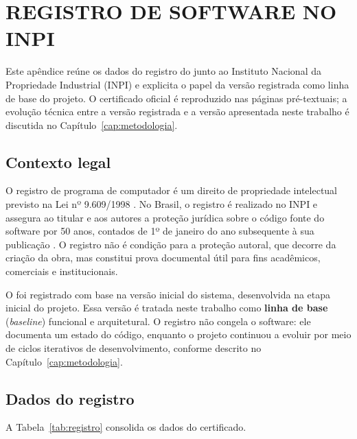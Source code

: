 
\chapter{REGISTRO DE SOFTWARE NO INPI}
\label{ap:registro-inpi}

Este apêndice reúne os dados do registro do \argus{} junto ao Instituto
Nacional da Propriedade Industrial (INPI) e explicita o papel da versão
registrada como linha de base do projeto. O certificado oficial é reproduzido
nas páginas pré-textuais; a evolução técnica entre a versão registrada e a
versão apresentada neste trabalho é discutida no
Capítulo~\ref{cap:metodologia}.

\section{Contexto legal}
\label{ap:registro-contexto}

O registro de programa de computador é um direito de propriedade intelectual
previsto na Lei nº 9.609/1998 \cite{lei9609}. No Brasil, o registro é realizado
no INPI e assegura ao titular e aos autores a proteção jurídica sobre o código
fonte do software por 50 anos, contados de 1º de janeiro do ano subsequente à
sua publicação \cite{inpi2026}. O registro não é condição para a proteção
autoral, que decorre da criação da obra, mas constitui prova documental útil
para fins acadêmicos, comerciais e institucionais.

O \argus{} foi registrado com base na versão inicial do sistema, desenvolvida
na etapa inicial do projeto. Essa versão é tratada neste trabalho como
\textbf{linha de base} (\textit{baseline}) funcional e arquitetural. O registro
não congela o software: ele documenta um estado do código, enquanto o projeto
continuou a evoluir por meio de ciclos iterativos de desenvolvimento,
conforme descrito no Capítulo~\ref{cap:metodologia}.

\section{Dados do registro}
\label{ap:registro-dados}

A Tabela~\ref{tab:registro} consolida os dados do certificado.

